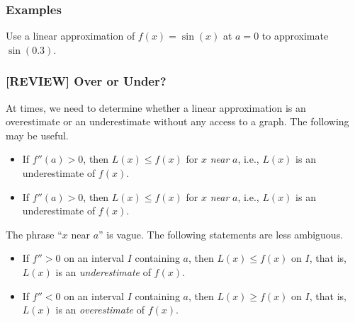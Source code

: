 \documentclass[10pt,t,handout,ignorenonframetext,aspectratio=169]{beamer}
\begin{document}
\begin{frame}
  \frametitle{Examples}
  \question{} Use a linear approximation of $f(x) =\sin(x)$ at $a=0$
  to approximate $\sin(0.3)$.
\end{frame}

\begin{frame}
  \frametitle{[REVIEW] Over or Under?}
  At times, we need to determine whether a linear approximation is an overestimate or an underestimate without any access to a graph. The following may be useful.
  \vs
  \begin{itemize}
  \item If $f''(a)>0$, then $L(x) \le f(x)$ for $x$ \textit{near} $a$, i.e., $L(x)$ is an underestimate of $f(x)$.
  \item If $f''(a)>0$, then $L(x) \le f(x)$ for $x$ \textit{near} $a$, i.e., $L(x)$ is an underestimate of $f(x)$.
  \end{itemize}
  \vs
  The phrase ``$x$ near $a$'' is vague. The following statements are less ambiguous.
  \vs
  \begin{itemize}
  \item If $f''>0$ on an interval $I$ containing $a$, then $L(x) \le f(x)$ on $I$, that is, $L(x)$ is an \textit{underestimate} of $f(x)$.
  \item If $f''<0$ on an interval $I$ containing $a$, then $L(x) \ge f(x)$ on $I$, that is, $L(x)$ is an \textit{overestimate} of $f(x)$.
  \end{itemize}
\end{frame}
\end{document}
